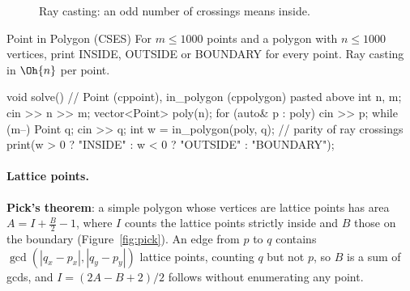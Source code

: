 \begin{figure}[htbp]
\centering
{}
\caption{Ray casting: an odd number of crossings means inside.}
\label{fig:raycast}
\end{figure}

\begin{problem}{Point in Polygon (CSES)}
For $m \le 1000$ points and a polygon with $n \le 1000$ vertices, print INSIDE, OUTSIDE or BOUNDARY for every point.
\solution Ray casting in $\Oh{n}$ per point.
\end{problem}

\begin{code}
void solve() {  // Point (cppoint), in_polygon (cppolygon) pasted above
    int n, m;
    cin >> n >> m;
    vector<Point> poly(n);
    for (auto& p : poly) cin >> p;
    while (m--) {
        Point q;
        cin >> q;
        int w = in_polygon(poly, q);  // parity of ray crossings
        print(w > 0 ? "INSIDE" : w < 0 ? "OUTSIDE" : "BOUNDARY");
    }
}
\end{code}

\paragraph{Lattice points.} \textbf{Pick's theorem}: a simple polygon whose vertices are lattice points has area $A = I + \frac{B}{2} - 1$,
where $I$ counts the lattice points strictly inside and $B$ those on the boundary (Figure~\ref{fig:pick}). An edge from $p$ to $q$ contains
$\gcd(|q_x - p_x|, |q_y - p_y|)$ lattice points, counting $q$ but not $p$, so $B$ is a sum of gcds, and $I = (2A - B + 2) / 2$ follows
without enumerating any point.

